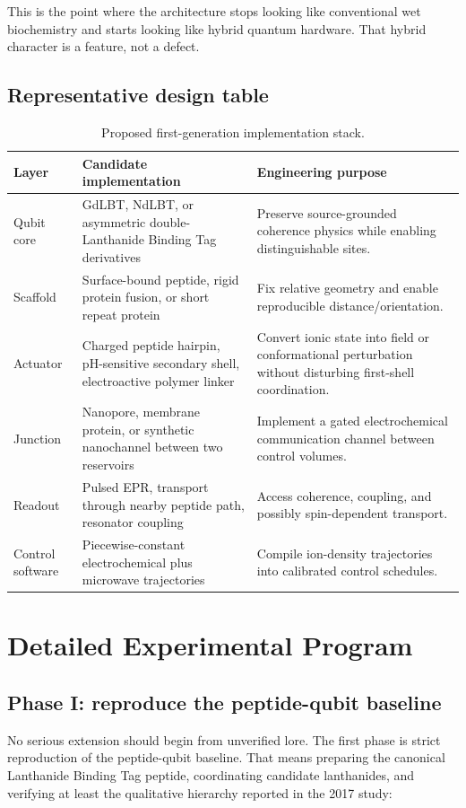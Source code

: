 \documentclass[11pt]{report}
\newcommand{\lbt}{Lanthanide Binding Tag}
\theoremstyle{definition}
\begin{document}
This is the point where the architecture stops looking like conventional wet biochemistry and starts looking like hybrid quantum hardware. That hybrid character is a feature, not a defect.

\section{Representative design table}
\begin{table}[ht]
\centering
\caption{Proposed first-generation implementation stack.}
\begin{tabularx}{\textwidth}{>{\raggedright\arraybackslash}p{2.8cm} >{\raggedright\arraybackslash}p{4.1cm} X}
\toprule
Layer & Candidate implementation & Engineering purpose \\
\midrule
Qubit core & GdLBT, NdLBT, or asymmetric double-\lbt{} derivatives & Preserve source-grounded coherence physics while enabling distinguishable sites. \\
Scaffold & Surface-bound peptide, rigid protein fusion, or short repeat protein & Fix relative geometry and enable reproducible distance/orientation. \\
Actuator & Charged peptide hairpin, pH-sensitive secondary shell, electroactive polymer linker & Convert ionic state into field or conformational perturbation without disturbing first-shell coordination. \\
Junction & Nanopore, membrane protein, or synthetic nanochannel between two reservoirs & Implement a gated electrochemical communication channel between control volumes. \\
Readout & Pulsed EPR, transport through nearby peptide path, resonator coupling & Access coherence, coupling, and possibly spin-dependent transport. \\
Control software & Piecewise-constant electrochemical plus microwave trajectories & Compile ion-density trajectories into calibrated control schedules. \\
\bottomrule
\end{tabularx}
\end{table}

\chapter{Detailed Experimental Program}

\section{Phase I: reproduce the peptide-qubit baseline}
No serious extension should begin from unverified lore. The first phase is strict reproduction of the peptide-qubit baseline. That means preparing the canonical \lbt{} peptide, coordinating candidate lanthanides, and verifying at least the qualitative hierarchy reported in the 2017 study:
\end{document}
